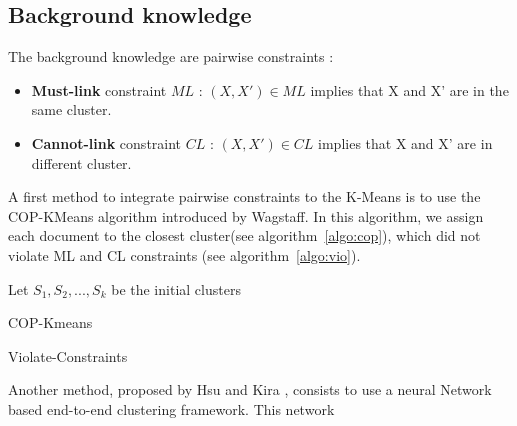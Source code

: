 \subsection{Background knowledge}
The background knowledge are pairwise constraints :
\begin{itemize}
\item \textbf{Must-link} constraint $ML$ : $(X, X') \in ML $ implies that X and X' are in the
  same cluster.
\item \textbf{Cannot-link} constraint $CL$ : $(X, X') \in CL $ implies that X and X' are in
  different cluster.
\end{itemize}
A first method to integrate pairwise constraints to the K-Means is to use the 
COP-KMeans algorithm introduced by Wagstaff\cite{Wagstaff:2001:CKC:645530.655669}.
In this algorithm, we assign each document to the closest cluster(see algorithm~\ref{algo:cop}), 
which did not violate ML and CL constraints (see algorithm~\ref{algo:vio}).
\begin{algorithm}[!h]
  Let $S_1, S_2 , ..., S_k$ be the initial clusters\\
  \caption{\label{algo:cop}COP-Kmeans}
\end{algorithm}
\begin{algorithm}[!h]
  \caption{\label{algo:vio}Violate-Constraints}
\end{algorithm}
Another method, proposed by Hsu and Kira \cite{2015arXiv151106321H}, consists to 
use a neural Network based end-to-end clustering framework. This network 

